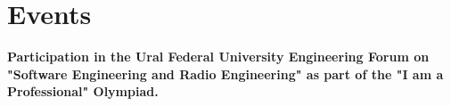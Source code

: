 \section{Events}
         \raggedright\textbf{{Participation in the Ural Federal University Engineering Forum on "Software Engineering and Radio Engineering" as part of the "I am a Professional" Olympiad.}}
             \vspace{5pt}
        



